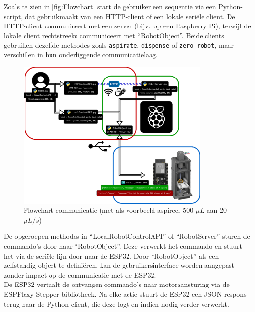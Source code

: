 Zoals te zien in \autoref{fig:Flowchart} start de gebruiker een sequentie via een Python-script, dat gebruikmaakt van een HTTP-client of een lokale seriële client. De HTTP-client communiceert met een server (bijv.\ op een Raspberry Pi), terwijl de lokale client rechtstreeks communiceert met ``RobotObject''. Beide clients gebruiken dezelfde methodes zoals \texttt{aspirate}, \texttt{dispense} of \texttt{zero\_robot}, maar verschillen in hun onderliggende communicatielaag.
\\[12pt]\begin{figure}[H]
    \centering
    \includegraphics[width=0.85\textwidth]{figures/Flowchart.png}
    \caption{Flowchart communicatie (met als voorbeeld aspireer 500 $\mu L$ aan 20 $\mu L/s$)}\label{fig:Flowchart}
\end{figure}
\vspace{0pt}
De opgeroepen methodes in ``LocalRobotControlAPI'' of ``RobotServer'' sturen de commando's door naar ``RobotObject''. Deze verwerkt het commando en stuurt het via de seriële lijn door naar de ESP32. Door ``RobotObject'' als een zelfstandig object te definiëren, kan de gebruikersinterface worden aangepast zonder impact op de communicatie met de ESP32.
\\[12pt]De ESP32 vertaalt de ontvangen commando’s naar motoraansturing via de ESPFlexy-Stepper bibliotheek. Na elke actie stuurt de ESP32 een JSON-respons terug naar de Python-client, die deze logt en indien nodig verder verwerkt.


